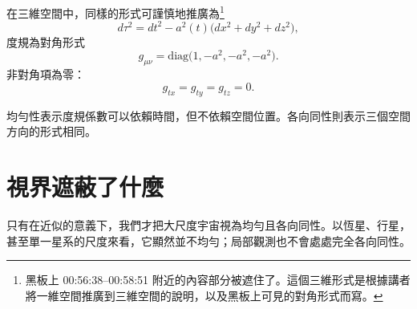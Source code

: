 在三維空間中，同樣的形式可謹慎地推廣為\footnote{黑板上 00:56:38--00:58:51 附近的內容部分被遮住了。這個三維形式是根據講者將一維空間推廣到三維空間的說明，以及黑板上可見的對角形式而寫。}
\begin{equation}
d\tau^2=dt^2-a^2(t)\bigl(dx^2+dy^2+dz^2\bigr),
\end{equation}
度規為對角形式
\begin{equation}
g_{\mu\nu}=\mathrm{diag}\bigl(1,-a^2,-a^2,-a^2\bigr).
\end{equation}
非對角項為零：
\begin{equation}
g_{tx}=g_{ty}=g_{tz}=0.
\end{equation}

均勻性表示度規係數可以依賴時間，但不依賴空間位置。各向同性則表示三個空間方向的形式相同。

\begin{classroomqa}
\end{classroomqa}

\begin{classroomqa}
\end{classroomqa}

\begin{classroomqa}
\end{classroomqa}

\section{視界遮蔽了什麼}

只有在近似的意義下，我們才把大尺度宇宙視為均勻且各向同性。以恆星、行星，甚至單一星系的尺度來看，它顯然並不均勻；局部觀測也不會處處完全各向同性。


